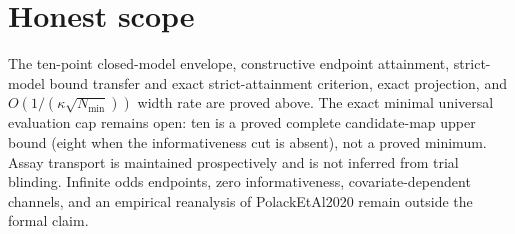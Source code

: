 \documentclass{article}
\begin{document}
\section{Honest scope}

The ten-point closed-model envelope, constructive endpoint attainment, strict-model bound transfer and exact strict-attainment criterion, exact projection, and \(O(1/(\kappa\sqrt{N_{\min}}))\) width rate are proved above. The exact minimal universal evaluation cap remains open: ten is a proved complete candidate-map upper bound (eight when the informativeness cut is absent), not a proved minimum. Assay transport is maintained prospectively and is not inferred from trial blinding. Infinite odds endpoints, zero informativeness, covariate-dependent channels, and an empirical reanalysis of PolackEtAl2020 remain outside the formal claim.
\end{document}
